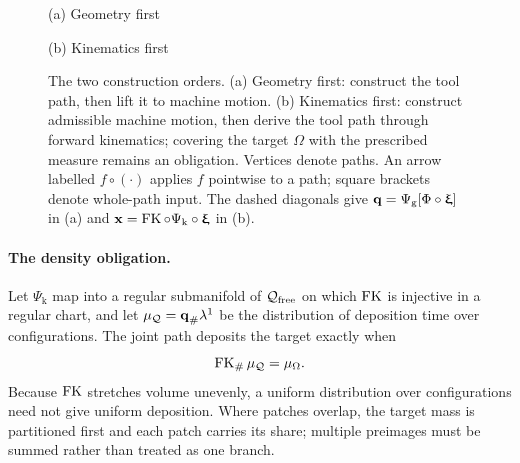 \begin{figure}[tbp]
  \centering
  \begin{minipage}[t]{0.48\textwidth}
    \centering

    {\small(a) Geometry first\par}
  \end{minipage}\hfill
  \begin{minipage}[t]{0.48\textwidth}
    \centering

    {\small(b) Kinematics first\par}
  \end{minipage}

  \caption{The two construction orders. (a) Geometry first: construct the tool path, then lift it to machine motion. (b) Kinematics first: construct admissible machine motion, then derive the tool path through forward kinematics; covering the target $\Omega$ with the prescribed measure remains an obligation. Vertices denote paths. An arrow labelled $f\circ(\cdot)$ applies $f$ pointwise to a path; square brackets denote whole-path input. The dashed diagonals give ${\bm{\mathrm{q}}}=\Psi_{\mathrm{g}}[\Phi\circ{\bm{\mathrm{\upxi}}}]$ in (a) and ${\bm{\mathrm{x}}}=\operatorname{FK}\circ\Psi_{\mathrm{k}}\circ{\bm{\mathrm{\upxi}}}$ in (b).}
  \label{fig:kin-order}
\end{figure}

\paragraph{The density obligation.}
\label{sec:kinematics-density}
Let $\Psi_{\mathrm{k}}$ map into a regular submanifold of $\mathcal{Q}_{\mathrm{free}}$ on which $\operatorname{FK}$ is injective in a regular chart, and let $\mu_{\mathcal{Q}}={\bm{\mathrm{q}}}_\#\lambda^1$ be the distribution of deposition time over configurations. The joint path deposits the target exactly when
\[
  \operatorname{FK}_\#\mu_{\mathcal{Q}}=\mu_\Omega .
\]
Because $\operatorname{FK}$ stretches volume unevenly, a uniform distribution over configurations need not give uniform deposition. Where patches overlap, the target mass is partitioned first and each patch carries its share; multiple preimages must be summed rather than treated as one branch.

